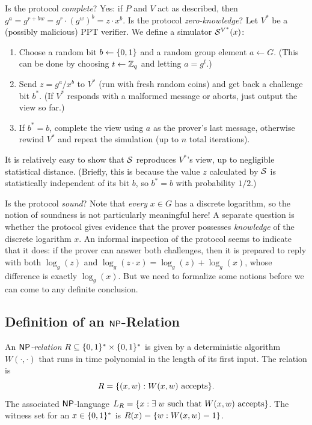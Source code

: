 \documentclass[11pt]{article}
\begin{document}
Is the protocol \emph{complete}?  Yes: if $P$ and $V$ act as
described, then $g^{a} = g^{r + bw} = g^{r} \cdot (g^{w})^{b} = z
\cdot x^{b}$.  Is the protocol \emph{zero-knowledge}?  Let $V^{*}$ be
a (possibly malicious) PPT verifier.  We define a simulator
$\mathcal{S}^{V^{*}}(x)$:
\begin{enumerate}

\item Choose a random bit $b \gets \{0,1\}$ and a random group element $a
  \gets G$.  (This can be done by choosing $t \gets \mathbb{Z}_q$ and letting
  $a = g^{t}$.)

\item Send $z = g^{a} / x^{b}$ to $V^{*}$ (run with fresh random
  coins) and get back a challenge bit $b^{*}$.  (If $V^{*}$ responds
  with a malformed message or aborts, just output the view so far.)

\item If $b^{*} = b$, complete the view using $a$ as the prover's last
  message, otherwise rewind $V^{*}$ and repeat the simulation (up to
  $n$ total iterations).
\end{enumerate}
It is relatively easy to show that $\mathcal{S}$ reproduces $V^{*}$'s view,
up to negligible statistical distance.  (Briefly, this is because the
value $z$ calculated by $\mathcal{S}$ is statistically independent of its bit
$b$, so $b^{*} = b$ with probability $1/2$.)

Is the protocol \emph{sound}?  Note that \emph{every} $x \in G$ has a
discrete logarithm, so the notion of soundness is not particularly
meaningful here!  A separate question is whether the protocol gives
evidence that the prover possesses \emph{knowledge} of the discrete
logarithm $x$.  An informal inspection of the protocol seems to
indicate that it does: if the prover can answer both challenges, then
it is prepared to reply with both $\log_{g}(z)$ and $\log_{g}(z \cdot
x) = \log_{g}(z) + \log_{g}(x)$, whose difference is exactly
$\log_{g}(x)$.  But we need to formalize some notions before we can
come to any definite conclusion.

\subsection{Definition of an $\mathsf{NP}$-Relation}
\label{sec:def-pok}

\begin{definition}
  \label{def:NP-relation}
  An \emph{$\mathsf{NP}$-relation} $R \subseteq \{0,1\}^{*} \times \{0,1\}^{*}$ is
  given by a deterministic algorithm $W(\cdot,\cdot)$ that runs in
  time polynomial in the length of its first input.  The relation
  is \[ R = \{(x,w) : W(x,w) \text{ accepts}\}. \] The associated
  $\mathsf{NP}$-language $L_{R} = \{x : \exists\; w \text{ such that }
    W(x,w) \text{ accepts}\}$.  The witness set for an $x \in \{0,1\}^{*}$
  is $R(x) = \{w : W(x,w) = 1\}$.
\end{definition}
\end{document}
